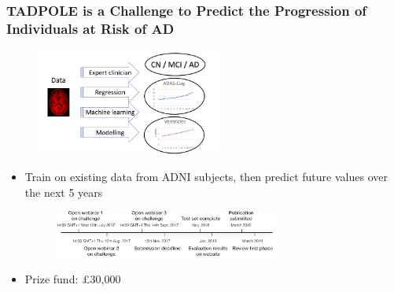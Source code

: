 \documentclass[8pt,xcolor=table]{beamer}
\begin{document}
\begin{frame}
\frametitle{TADPOLE is a Challenge to Predict the Progression of Individuals at Risk of AD}

 \begin{figure}
\centering
\includegraphics[height=3.5cm]{tadpole_diagram} 
\end{figure}

\vfill

\begin{itemize}
 \item Train on existing data from ADNI subjects, then predict future values over the next 5 years

 \begin{figure}
\centering
\includegraphics[width=0.7\textwidth]{Figure_Timeline_Black} 
\end{figure}

 \vfill
 
 \item Prize fund: \pounds 30,000
\end{itemize}


\end{frame}
\end{document}

